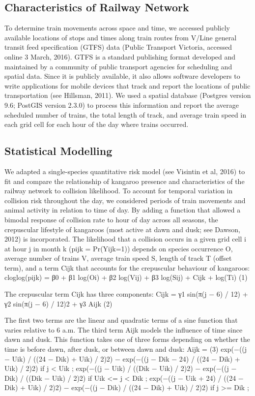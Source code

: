 \subsection{Characteristics of Railway Network}

To determine train movements across space and time, we accessed publicly available locations of stops and times along train routes from V/Line general transit feed specification (GTFS) data (Public Transport Victoria, accessed online 3 March, 2016).  GTFS is a standard publishing format developed and maintained by a community of public transport agencies for scheduling and spatial data.  Since it is publicly available, it also allows software developers to write applications for mobile devices that track and report the locations of public transportation (see Hillsman, 2011).  We used a spatial database (Postgres version 9.6; PostGIS version 2.3.0) to process this information and report the average scheduled number of trains, the total length of track, and average train speed in each grid cell for each hour of the day where trains occurred.

\subsection{Statistical Modelling}

We adapted a single-species quantitative risk model (see Visintin et al, 2016) to fit and compare the relationship of kangaroo presence and characteristics of the railway network to collision likelihood. To account for temporal variation in collision risk throughout the day, we considered periods of train movements and animal activity in relation to time of day. By adding a function that allowed a bimodal response of collision rate to hour of day across all seasons, the crepuscular lifestyle of kangaroos (most active at dawn and dusk; see Dawson, 2012) is incorporated. The likelihood that a collision occurs in a given grid cell i at hour j in month k (pijk = Pr(Yijk=1)) depends on species occurrence O, average number of trains V, average train speed S, length of track T (offset term), and a term Cijk that accounts for the crepuscular behaviour of kangaroos:
cloglog(pijk) = β0 + β1 log(Oi) + β2 log(Vij) + β3 log(Sij) + Cijk + log(Ti)	      		(1)

The crepuscular term Cijk has three components:
Cijk = γ1 sin(π(j − 6) / 12) + γ2 sin(π(j − 6) / 12)2 + γ3 Aijk				(2)

The first two terms are the linear and quadratic terms of a sine function that varies relative to 6 a.m. The third term Aijk models the influence of time since dawn and dusk. This function takes one of three forms depending on whether the time is before dawn, after dusk, or between dawn and dusk:
Aijk =										(3)
    exp(−((j − Uik) / ((24 − Dik) + Uik) / 2)2) − exp(−((j − Dik − 24) / ((24 − Dik) + Uik) / 2)2)    if j < Uik ;
    exp(−((j − Uik) / ((Dik − Uik) / 2)2) − exp(−((j − Dik) / ((Dik − Uik) / 2)2) 		 if Uik  <= j < Dik ;
    exp(−((j − Uik + 24) / ((24 − Dik) + Uik) / 2)2) − exp(−((j − Dik) / ((24 − Dik) + Uik) / 2)2) 	 if j >= Dik ;

